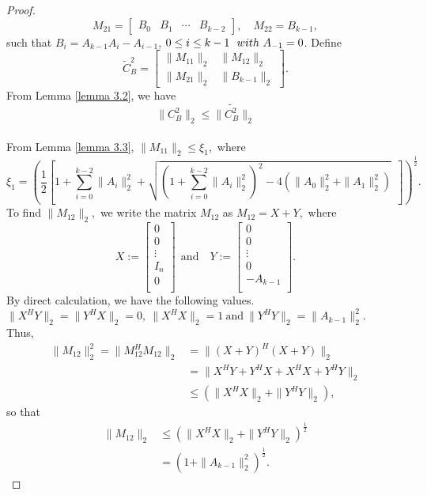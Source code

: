 \documentclass [12pt]{article}
\begin{document}
\begin{proof}
\[
M_{21} = 
\begin{bmatrix}
B_0 & B_1 & \cdots & B_{k-2}
\end{bmatrix}, \quad M_{22} = B_{k-1},
\] such that $B_i = A_{k-1}A_i - A_{i-1}$, $0 \leq i \leq k-1~ \mbox~{with}~ A_{-1} = 0$.
Define
\[
\tilde{C}^{2}_{B} = \begin{bmatrix} \|M_{11}\|_{2} & \|M_{12}\|_{2} \\ \|M_{21}\|_2 & \|B_{k-1}\|_2 \end{bmatrix}.
\]
From Lemma \ref{lemma 3.2}, we have
$$\|C_{B}^{2}\|_{2} \le\|\tilde{C_{B}^{2}}\|_{2}$$\\
From Lemma \ref{lemma 3.3}, $\|M_{11}\|_{2}\le\xi_{1},$ where \begin{equation*}
\xi_{1} = \left( \frac{1}{2} \left[ 1+\sum_{i=0}^{k-2}\|A_{i}\|_{2}^{2}  +  \sqrt{\left(1+\sum_{i=0}^{k-2}\|A_{i}\|_{2}^{2}\right)^{2}-4\left(\|A_{0}\|_{2}^{2}+\|A_{1}\|_{2}^{2}\right)} ~~\right] \right)^{\frac{1}{2}}.
\end{equation*}
To find $\|M_{12}\|_{2},$ we write the matrix $M_{12}$ as $M_{12}=X+Y,$ where
\[X := 
\begin{bmatrix}
0\\
 0 \\
\vdots \\ I_{n}\\0\\
\end{bmatrix}~~ \mbox{and} \quad Y := 
\begin{bmatrix}
0\\
 0 \\
\vdots \\ 0\\-A_{k-1}\\
\end{bmatrix}. \] 
By direct calculation, we have the following values.\\
$\|X^{H}Y\|_{2}=\|Y^{H}X\|_{2}=0,~\|X^{H}X\|_{2}=1~\mbox{and}~\|Y^{H}Y\|_{2}=\|A_{k-1}\|^{2}_{2}.$\\
Thus,\begin{align*}
    \|M_{12}\|^{2}_{2}=\|M^{H}_{12}M_{12}\|_{2}&=\|(X+Y)^{H}(X+Y)\|_{2}\\&=\|X^{H}Y+Y^{H}X+X^{H}X+Y^{H}Y\|_{2}\\&\le\left( \|X^{H}X\|_{2}+\|Y^{H}Y\|_{2}\right),
\end{align*}
so that
\begin{align*}
    \|M_{12}\|_{2}&\le \left( \|X^{H}X\|_{2}+\|Y^{H}Y\|_{2}\right)^\frac{1}{2}\\&=\left( 1+\|A_{k-1}\|^{2}_{2}\right)^\frac{1}{2}.

\end{align*}
\end{proof}
\end{document}
